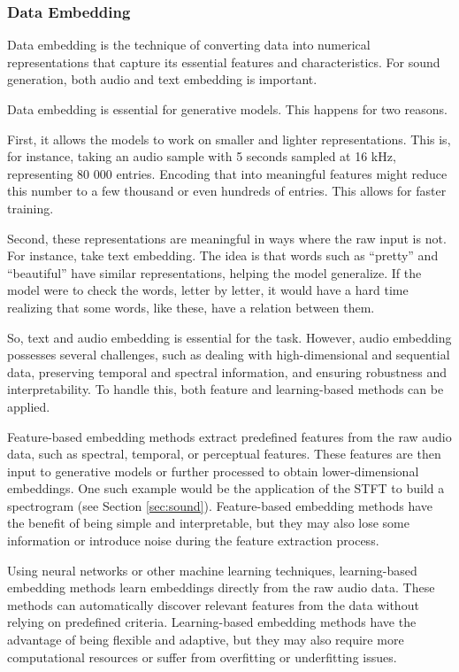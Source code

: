 \subsubsection{Data Embedding} \label{sec:text-embedding}

Data embedding is the technique of converting data into numerical representations that capture its essential features and characteristics. For sound generation, both audio and text embedding is important.

Data embedding is essential for generative models. This happens for two reasons.

First, it allows the models to work on smaller and lighter representations. This is, for instance, taking an audio sample with 5 seconds sampled at 16 kHz, representing 80 000 entries. Encoding that into meaningful features might reduce this number to a few thousand or even hundreds of entries. This allows for faster training.

Second, these representations are meaningful in ways where the raw input is not. For instance, take text embedding. The idea is that words such as ``pretty'' and ``beautiful'' have similar representations, helping the model generalize. If the model were to check the words, letter by letter, it would have a hard time realizing that some words, like these, have a relation between them.

So, text and audio embedding is essential for the task. However, audio embedding possesses several challenges, such as dealing with high-dimensional and sequential data, preserving temporal and spectral information, and ensuring robustness and interpretability. To handle this, both feature and learning-based methods can be applied.

Feature-based embedding methods extract predefined features from the raw audio data, such as spectral, temporal, or perceptual features. These features are then input to generative models or further processed to obtain lower-dimensional embeddings. One such example would be the application of the \ac{STFT} to build a spectrogram (see Section \ref{sec:sound}). Feature-based embedding methods have the benefit of being simple and interpretable, but they may also lose some information or introduce noise during the feature extraction process.

Using neural networks or other machine learning techniques, learning-based embedding methods learn embeddings directly from the raw audio data. These methods can automatically discover relevant features from the data without relying on predefined criteria. Learning-based embedding methods have the advantage of being flexible and adaptive, but they may also require more computational resources or suffer from overfitting or underfitting issues.

